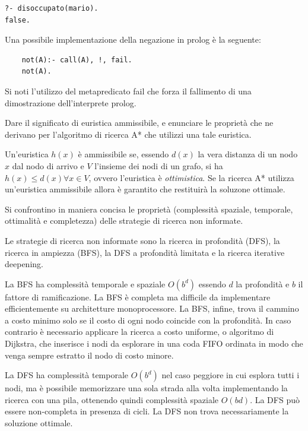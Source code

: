 \documentclass[answers, a4paper, 11pt]{exam}
\begin{document}
\begin{questions}
\begin{solution}
\begin{verbatim}
?- disoccupato(mario).
false.

  \end{verbatim}
  Una possibile implementazione della negazione in prolog è la seguente: \newline
  \begin{verbatim}
    not(A):- call(A), !, fail.
    not(A).
  \end{verbatim}
  Si noti l'utilizzo del metapredicato fail che forza il fallimento di una dimostrazione dell'interprete prolog.
    \end{solution}


\question Dare il significato di euristica ammissibile, e enunciare le proprietà che ne derivano per l’algoritmo
di ricerca A* che utilizzi una tale euristica.
	\begin{solution}
		Un'euristica $h(x)$ è ammissibile se, essendo $d(x)$ la vera distanza di un nodo $x$ dal nodo di arrivo e $V$ l'insieme dei nodi di un grafo, si ha $h(x) \leq d(x) \forall x \in V$, ovvero l'euristica è \emph{ottimistica}. 
		Se la ricerca A* utilizza un'euristica ammissibile allora è garantito che restituirà la soluzone ottimale. 
	\end{solution}
\question Si confrontino in maniera concisa le proprietà (complessità spaziale, temporale, ottimalità e completezza) delle strategie di ricerca non informate.
\begin{solution}
  Le strategie di  ricerca non informate sono la ricerca in profondità (DFS), la ricerca in ampiezza (BFS), la DFS a profondità limitata e la ricerca iterative deepening. 

  La BFS ha complessità temporale e spaziale $O(b^d)$ essendo $d$ la profondità e $b$ il fattore di ramificazione.
  La BFS è completa ma difficile da implementare efficientemente su architetture monoprocessore.
  La BFS, infine, trova il cammino a costo minimo solo se il costo di ogni nodo coincide con la profondità. 
  In caso contrario è necessario applicare la ricerca a costo uniforme, o algoritmo di Dijkstra, che inserisce i nodi da esplorare in una coda FIFO ordinata in modo che venga sempre estratto il nodo di costo minore. 
  
  La DFS ha complessità temporale $O(b^d)$ nel caso peggiore in cui esplora tutti i nodi, ma è possibile memorizzare una sola strada alla volta implementando la ricerca con una pila, ottenendo quindi complessità spaziale $O(bd)$. 
  La DFS può essere non-completa in presenza di cicli. 
  La DFS non trova necessariamente la soluzione ottimale. 


\end{solution}
\end{questions}
\end{document}
